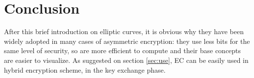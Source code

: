 \documentclass{article}
\begin{document}

\section{Conclusion}

After this brief introduction on elliptic curves, it is obvious why they have been widely adopted in many cases of asymmetric encryption: they use less bits for the same level of security, so are more efficient to compute and their base concepts are easier to visualize. As suggested on section \ref{sec:use}, EC can be easily used in hybrid encryption scheme, in the key exchange phase.






\end{document}
